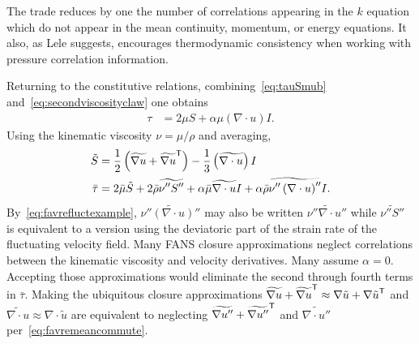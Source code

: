 The trade reduces by one the number of correlations appearing in the $k$
equation which do not appear in the mean continuity, momentum, or energy
equations.  It also, as Lele suggests, encourages thermodynamic consistency
when working with pressure correlation information.

Returning to the constitutive relations, combining~\eqref{eq:tauSmub}
and~\eqref{eq:secondviscosityclaw} one obtains
\begin{align}
  \tau
&= 2 \mu{} S + \alpha \mu \left( \nabla\cdot{}u \right) I.
\end{align}
Using the kinematic viscosity $\nu = \mu / \rho$ and averaging,
\begin{align}
   \tilde{S}
&=
     \frac{1}{2}\left(
       \widetilde{\nabla{}u} + {\widetilde{\nabla{}u}}^{\mathsf{T}}
     \right)
   - \frac{1}{3}\left(\widetilde{\nabla\cdot{}u}\right) I
\\
  \bar{\tau}
&=
    2 \bar{\mu}\tilde{S}
  + 2 \bar{\rho} \widetilde{\nu''S''}
  + \alpha \bar{\mu} \widetilde{\nabla\cdot{}u} I
  + \alpha \bar{\rho} \widetilde{\nu''\left(\nabla\cdot{}u\right)''} I
.
\end{align}
By~\eqref{eq:favrefluctexample},
$\widetilde{\nu''\left(\nabla\cdot{}u\right)''}$ may also be written
$\widetilde{\nu''\nabla\cdot{}u''}$ while $\widetilde{\nu''S''}$ is equivalent
to a version using the deviatoric part of the strain rate of the fluctuating
velocity field.  Many FANS closure approximations neglect correlations between
the kinematic viscosity and velocity derivatives.  Many assume $\alpha=0$.
Accepting those approximations would eliminate the second through fourth terms
in $\bar{\tau}$.  Making the ubiquitous closure approximations
$\widetilde{\nabla{}u} + {\widetilde{\nabla{}u}}^{\mathsf{T}} \approx \nabla\tilde{u}
+ {\nabla\tilde{u}}^{\mathsf{T}}$ and
$\widetilde{\nabla{}\cdot{}u}\approx\nabla\cdot\tilde{u}$ are equivalent to
neglecting $\widetilde{\nabla{}u''} + {\widetilde{\nabla{}u''}}^{\mathsf{T}}$ and
$\widetilde{\nabla{}\cdot{}u''}$ per~\eqref{eq:favremeancommute}.

